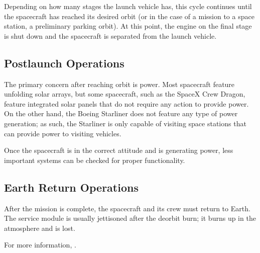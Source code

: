 Depending on how many stages the launch vehicle has, this cycle
continues until the spacecraft has reached its desired orbit (or in
the case of a mission to a space station, a preliminary parking
orbit). At this point, the engine on the final stage is shut down and
the spacecraft is separated from the launch vehicle.

\subsection{Postlaunch Operations}

The primary concern after reaching orbit is power. Most spacecraft
feature unfolding solar arrays, but some spacecraft, such as the
SpaceX Crew Dragon, feature integrated solar panels that do not
require any action to provide power. On the other hand, the Boeing
Starliner does not feature any type of power generation; as such, the
Starliner is only capable of visiting space stations that can provide
power to visiting vehicles.

Once the spacecraft is in the correct attitude and is generating
power, less important systems can be checked for proper functionality.

\subsection{Earth Return Operations}

After the mission is complete, the spacecraft and its crew must return
to Earth. The service module is usually jettisoned after the deorbit
burn; it burns up in the atmosphere and is lost.

For more information, .
